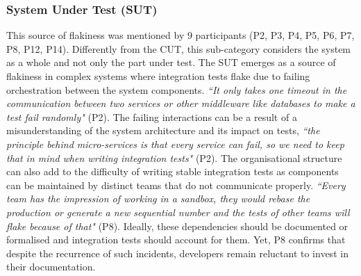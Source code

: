 \subsubsection{\textbf{System Under Test (SUT)}}
This source of flakiness was mentioned by 9 participants (P2, P3, P4, P5, P6, P7, P8, P12, P14).
Differently from the CUT, this sub-category considers the system as a whole and not only the part under test.
The SUT emerges as a source of flakiness in complex systems where integration tests flake due to failing orchestration between the system components.
\textit{``It only takes one timeout in the communication between two services or other middleware like databases to make a test fail randomly"} (P2).
The failing interactions can be a result of a misunderstanding of the system architecture and its impact on tests,
\textit{``the principle behind micro-services is that every service can fail, so we need to keep that in mind when writing integration tests"} (P2).
The organisational structure can also add to the difficulty of writing stable integration tests as components can be maintained by distinct teams that do not communicate properly.
\textit{``Every team has the impression of working in a sandbox, they would rebase the production or generate a new sequential number and the tests of other teams will flake because of that"} (P8).
Ideally, these dependencies should be documented or formalised and integration tests should account for them.
Yet, P8 confirms that  despite the recurrence of such incidents, developers remain reluctant to invest in their documentation.

